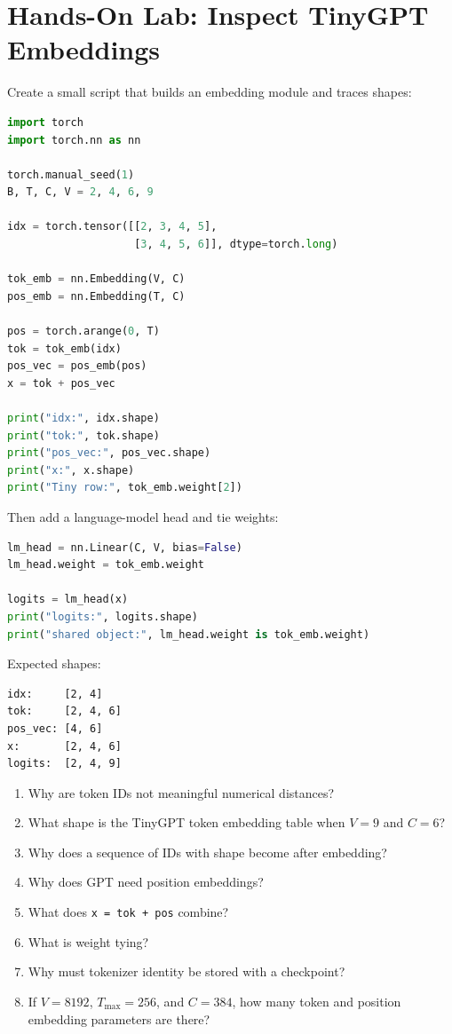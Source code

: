 \section{Hands-On Lab: Inspect TinyGPT Embeddings}

Create a small script that builds an embedding module and traces shapes:

\begin{lstlisting}[language=Python]
import torch
import torch.nn as nn

torch.manual_seed(1)
B, T, C, V = 2, 4, 6, 9

idx = torch.tensor([[2, 3, 4, 5],
                    [3, 4, 5, 6]], dtype=torch.long)

tok_emb = nn.Embedding(V, C)
pos_emb = nn.Embedding(T, C)

pos = torch.arange(0, T)
tok = tok_emb(idx)
pos_vec = pos_emb(pos)
x = tok + pos_vec

print("idx:", idx.shape)
print("tok:", tok.shape)
print("pos_vec:", pos_vec.shape)
print("x:", x.shape)
print("Tiny row:", tok_emb.weight[2])
\end{lstlisting}

Then add a language-model head and tie weights:

\begin{lstlisting}[language=Python]
lm_head = nn.Linear(C, V, bias=False)
lm_head.weight = tok_emb.weight

logits = lm_head(x)
print("logits:", logits.shape)
print("shared object:", lm_head.weight is tok_emb.weight)
\end{lstlisting}

Expected shapes:

\begin{lstlisting}
idx:     [2, 4]
tok:     [2, 4, 6]
pos_vec: [4, 6]
x:       [2, 4, 6]
logits:  [2, 4, 9]
\end{lstlisting}

\checkpoint

\begin{enumerate}
  \item Why are token IDs not meaningful numerical distances?
  \item What shape is the TinyGPT token embedding table when \(V=9\) and \(C=6\)?
  \item Why does a sequence of IDs with shape \shape{[T]} become \shape{[T,C]} after embedding?
  \item Why does GPT need position embeddings?
  \item What does \texttt{x = tok + pos} combine?
  \item What is weight tying?
  \item Why must tokenizer identity be stored with a checkpoint?
  \item If \(V=8192\), \(T_{\max}=256\), and \(C=384\), how many token and position embedding parameters are there?
\end{enumerate}

